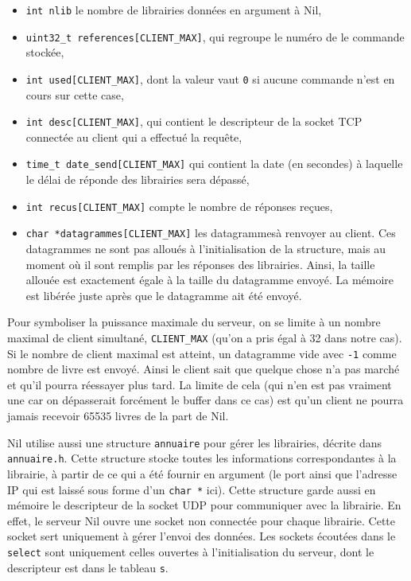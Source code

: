 \documentclass[10pt,a4paper]{article}
\renewcommand{\ss}{\vspace{\baselineskip}}
\begin{document}
\begin{multicols}{2}
\begin{itemize}
	\item \texttt{int nlib} le nombre de librairies données en argument à Nil,
	\item \texttt{uint32\_t references[CLIENT\_MAX]}, qui regroupe le numéro de le commande stockée,
	\item \texttt{int used[CLIENT\_MAX]}, dont la valeur vaut \texttt{0} si aucune commande n'est en cours sur cette case,
	\item \texttt{int desc[CLIENT\_MAX]}, qui contient le descripteur de la socket TCP connectée au client qui a effectué la requête,
	\item \texttt{time\_t date\_send[CLIENT\_MAX]} qui contient la date (en secondes) à laquelle le délai de réponde des librairies sera dépassé,
	\item \texttt{int recus[CLIENT\_MAX]} compte le nombre de réponses reçues,
	\item \texttt{char *datagrammes[CLIENT\_MAX]} les datagrammes\linebreak à renvoyer au client. Ces datagrammes ne sont pas alloués à l'initialisation de la structure, mais au moment où il sont remplis par les réponses des librairies. Ainsi, la taille allouée est exactement égale à la taille du datagramme envoyé. La mémoire est libérée juste après que le datagramme ait été envoyé.
\end{itemize}



Pour symboliser la puissance maximale du serveur, on se limite à un nombre maximal de client simultané, \texttt{CLIENT\_MAX} (qu'on a pris égal à 32 dans notre cas). Si le nombre de client maximal est atteint, un datagramme vide avec \texttt{-1} comme nombre de livre est envoyé. Ainsi le client sait que quelque chose n'a pas marché et qu'il pourra réessayer plus tard. La limite de cela (qui n'en est pas vraiment une car on dépasserait forcément le buffer dans ce cas) est qu'un client ne pourra jamais recevoir 65535 livres de la part de Nil.


\ss

Nil utilise aussi une structure \texttt{annuaire} pour gérer les librairies, décrite dans \texttt{annuaire.h}. Cette structure stocke toutes les informations correspondantes à la librairie, à partir de ce qui a été fournir en argument (le port ainsi que l'adresse IP qui est laissé sous forme d'un \texttt{char *} ici). Cette structure garde aussi en mémoire le descripteur de la socket UDP pour communiquer avec la librairie. En effet, le serveur Nil ouvre une socket non connectée pour chaque librairie. Cette socket sert uniquement à gérer l'envoi des données. Les sockets écoutées dans le \texttt{select} sont uniquement celles ouvertes à l'initialisation du serveur, dont le descripteur est dans le tableau \texttt{s}.



\end{multicols}
\end{document}
